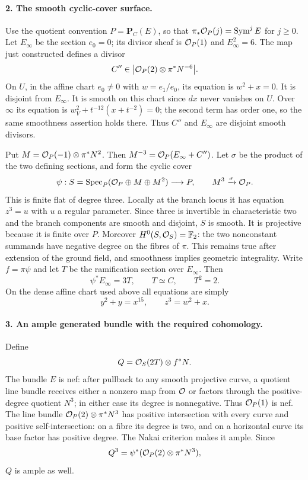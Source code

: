 \paragraph{2. The smooth cyclic-cover surface.}
Use the quotient convention $P=\mathbf P_C(E)$, so that
$\pi_*\mathcal O_P(j)=\operatorname{Sym}^jE$ for $j\geq0$.
Let $E_\infty$ be the section $e_0=0$; its divisor sheaf is
$\mathcal O_P(1)$ and $E_\infty^2=6$. The map just constructed defines
a divisor
\[
 C''\in\big|\mathcal O_P(2)\otimes\pi^*N^{-6}\big|.
\]
On $U$, in the affine chart $e_0\ne0$ with $w=e_1/e_0$, its
equation is $w^2+x=0$. It is disjoint from $E_\infty$.
It is smooth on this chart since $dx$ never vanishes on $U$.
Over $\infty$ its equation is
$w_V^2+t^{-12}(x+t^{-2})=0$; the second term has order one,
so the same smoothness assertion holds there. Thus $C''$ and
$E_\infty$ are disjoint smooth divisors.

Put $M=\mathcal O_P(-1)\otimes\pi^*N^2$. Then
$M^{-3}=\mathcal O_P(E_\infty+C'')$. Let $\sigma$ be the product of
the two defining sections, and form the cyclic cover
\[
 \psi:S=\operatorname{Spec}_P
       (\mathcal O_P\oplus M\oplus M^2)\longrightarrow P,
 \qquad M^3\xrightarrow{\sigma}\mathcal O_P.
\]
This is finite flat of degree three. Locally at the branch locus it
has equation $z^3=u$ with $u$ a regular parameter. Since three is
invertible in characteristic two and the branch components are smooth
and disjoint, $S$ is smooth. It is projective because it is finite over
$P$. Moreover $H^0(S,\mathcal O_S)=\mathbb F_2$: the two nonconstant
summands have negative degree on the fibres of $\pi$. This remains
true after extension of the ground field, and smoothness implies
geometric integrality. Write $f=\pi\psi$ and let $T$ be the
ramification section over $E_\infty$. Then
\[
 \psi^*E_\infty=3T,\qquad T\simeq C,\qquad T^2=2.
\]
On the dense affine chart used above all equations are simply
\begin{equation}\label{a:surface-affine}
 y^2+y=x^{15},\qquad z^3=w^2+x.
\end{equation}

\paragraph{3. An ample generated bundle with the required cohomology.}
Define
\[
 Q=\mathcal O_S(2T)\otimes f^*N.
\]
The bundle $E$ is nef: after pullback to any smooth projective curve,
a quotient line bundle receives either a nonzero map from $\mathcal O$ or
factors through the positive-degree quotient $N^3$; in either case
its degree is nonnegative. Thus $\mathcal O_P(1)$ is nef. The line bundle
$\mathcal O_P(2)\otimes\pi^*N^3$ has positive intersection with every
curve and positive self-intersection: on a fibre its degree is two,
and on a horizontal curve its base factor has positive degree.
The Nakai criterion makes it ample. Since
\[
 Q^3=\psi^*(\mathcal O_P(2)\otimes\pi^*N^3),
\]
$Q$ is ample as well.

